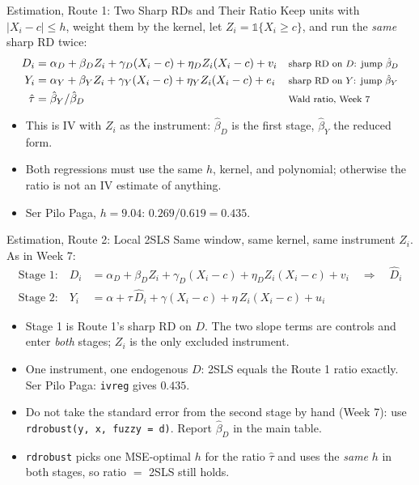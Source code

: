 \documentclass[aspectratio=169,11pt,xcolor=dvipsnames]{beamer}
\begin{document}
\begin{frame}{Estimation, Route 1: Two Sharp RDs and Their Ratio}
Keep units with $|X_i - c| \leq h$, weight them by the kernel, let
$Z_i = \mathds 1\{X_i \geq c\}$, and run the \emph{same} sharp RD twice:
\begin{align*}
  D_i &= \alpha_D + \beta_D Z_i + \gamma_D (X_i - c) + \eta_D Z_i (X_i - c) + v_i
   && \text{\footnotesize sharp RD on $D$: jump $\hat\beta_D$} \\
  Y_i &= \alpha_Y + \beta_Y Z_i + \gamma_Y (X_i - c) + \eta_Y Z_i (X_i - c) + e_i
   && \text{\footnotesize sharp RD on $Y$: jump $\hat\beta_Y$} \\
  \hat\tau &= \hat\beta_Y / \hat\beta_D
   && \text{\footnotesize Wald ratio, Week 7}
\end{align*}
\vskip-2pt
\begin{itemize}\itemsep2pt
  \item This is IV with $Z_i$ as the instrument: $\hat\beta_D$ is the first stage,
        $\hat\beta_Y$ the reduced form.
  \item Both regressions must use the \alert{same} $h$, kernel, and polynomial;
        otherwise the ratio is not an IV estimate of anything.
  \item Ser Pilo Paga, $h = 9.04$: $0.269 / 0.619 = 0.435$.
\end{itemize}
\end{frame}

\begin{frame}{Estimation, Route 2: Local 2SLS}
Same window, same kernel, same instrument $Z_i$. As in Week 7:
\begin{align*}
  \text{Stage 1:}\quad D_i &= \alpha_D + \beta_D Z_i + \gamma_D (X_i - c) + \eta_D Z_i (X_i - c) + v_i
  \quad\Longrightarrow\quad \hat D_i \\[3pt]
  \text{Stage 2:}\quad Y_i &= \alpha + \tau\,\hat D_i + \gamma (X_i - c) + \eta\, Z_i (X_i - c) + u_i
\end{align*}
\vskip-2pt
\begin{itemize}\itemsep2pt
  \item Stage 1 is Route 1's sharp RD on $D$. The two slope terms are
        controls and enter \emph{both} stages; $Z_i$ is the only excluded instrument.
  \item One instrument, one endogenous $D$: 2SLS equals the Route 1 ratio exactly.
        Ser Pilo Paga: \texttt{ivreg} gives $0.435$.
  \item Do not take the standard error from the second stage by hand (Week 7):
        use \texttt{rdrobust(y, x, fuzzy = d)}. Report $\hat\beta_D$ in the main table.
  \item \texttt{rdrobust} picks one MSE-optimal $h$ for the ratio $\hat\tau$ and uses
        the \emph{same} $h$ in both stages, so ratio $=$ 2SLS still holds.
\end{itemize}
\end{frame}
\end{document}
